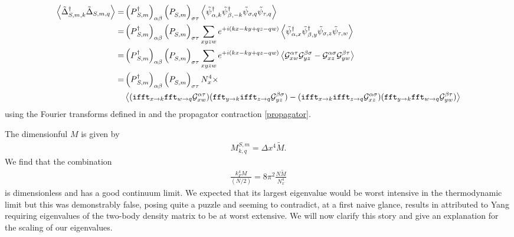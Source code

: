 \begin{align}
    \left\langle  \tilde{\Delta}{}^{\dagger}_{S,m,k} \tilde{\Delta}_{S,m,q}  \right\rangle
    =&
    \left(P{}^{\dagger}_{S,m}\right)_{\alpha\beta} \left(P^{\phantom{\dagger}}_{S,m}\right)_{\sigma\tau} \left\langle  
        \tilde{\psi}{}^{\dagger}_{\alpha,k} \tilde{\psi}{}^{\dagger}_{\beta,-k}
        \tilde{\psi}_{\sigma,q} \tilde{\psi}_{\tau,q}  \right\rangle
    \nonumber\\
    =&
    \left(P{}^{\dagger}_{S,m}\right)_{\alpha\beta} \left(P^{\phantom{\dagger}}_{S,m}\right)_{\sigma\tau}
    \sum_{xyzw} e^{+i(kx-ky+qz-qw)}
    \left\langle  
        \tilde{\psi}{}^{\dagger}_{\alpha,x} \tilde{\psi}{}^{\dagger}_{\beta,y}
        \tilde{\psi}_{\sigma,z} \tilde{\psi}_{\tau,w}
         \right\rangle
    \nonumber\\
    =&
    \left(P{}^{\dagger}_{S,m}\right)_{\alpha\beta} \left(P^{\phantom{\dagger}}_{S,m}\right)_{\sigma\tau}
    \sum_{xyzw} e^{+i(kx-ky+qz-qw)}
    \left\langle  
            \mathcal{G}^{\alpha\tau}_{xw} \mathcal{G}^{\beta\sigma}_{yz}
        -   \mathcal{G}^{\alpha\sigma}_{xz} \mathcal{G}^{\beta\tau}_{yw}
         \right\rangle
    \nonumber\\
    =&
    \left(P{}^{\dagger}_{S,m}\right)_{\alpha\beta} \left(P^{\phantom{\dagger}}_{S,m}\right)_{\sigma\tau}
    N_x^4 \times
    \\
    &
    \left\langle  
            (\texttt{ifft}_{x \rightarrow k} \texttt{fft}_{w \rightarrow q}\mathcal{G}^{\alpha\tau}_{xw})
            (\texttt{fft}_{y \rightarrow k} \texttt{ifft}_{z \rightarrow q}\mathcal{G}^{\beta\sigma}_{yz})
        -   (\texttt{ifft}_{x \rightarrow k} \texttt{ifft}_{z \rightarrow q}\mathcal{G}^{\alpha\sigma}_{xz})
            (\texttt{fft}_{y \rightarrow k} \texttt{fft}_{w \rightarrow q} \mathcal{G}^{\beta\tau}_{yw})
         \right\rangle
    \nonumber
\end{align}
using the Fourier transforms defined in  and the propagator contraction \eqref{propagator}.

The dimensionful $M$ is given by
\begin{align}
    M^{S,m}_{k,q} = \Delta x^4 \tilde{M}.
\end{align}
We find that the combination
\begin{align}
    \frac{k_F^4 M}{(N/2)} = 8\pi^2 \frac{N \tilde{M}}{N_x^4}
\end{align}
is dimensionless and has a good continuum limit.  We expected that its largest eigenvalue would be worst intensive in the thermodynamic limit but this was demonstrably false, posing quite a puzzle and seeming to contradict, at a first naive glance, results in  attributed to Yang \cite{yang:1962} requiring eigenvalues of the two-body density matrix to be at worst extensive.
We will now clarify this story and give an explanation for the scaling of our eigenvalues.

